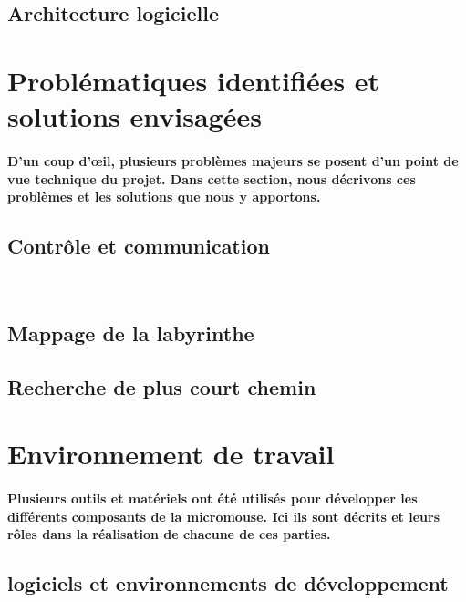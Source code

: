 \subsection{Architecture logicielle} \label{subsec:vueLogicielle}

\section{Problématiques identifiées et solutions envisagées} \label{sec:problemesSolutions}

\paragraph{
D'un coup d'œil, plusieurs problèmes majeurs se posent d'un point de vue technique du projet.
Dans cette section, nous décrivons ces problèmes et les solutions que nous y apportons.
}

\subsection{Contrôle et communication} \label{subsec:ctrlComm}

\subsection{Mappage de la labyrinthe} \label{subsec:mapMaze}

\subsection{Recherche de plus court chemin} \label{subsec:rechChem}

\section{Environnement de travail} \label{sec:environnement}

\paragraph{
Plusieurs outils et matériels ont été utilisés pour développer les différents composants
de la micromouse. Ici ils sont décrits et leurs rôles dans la réalisation de chacune de ces parties.
}

\subsection{logiciels et environnements de développement} \label{subsec:softDev}
